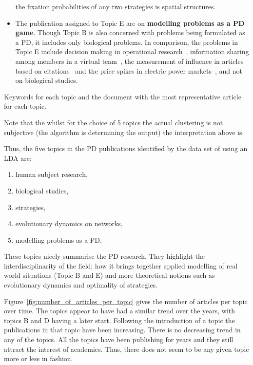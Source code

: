 \begin{itemize}
    the fixation probabilities of any two strategies is spatial
    structures.
    \item The publication assigned to Topic E are on \textbf{modelling problems
    as a PD game}. Though Topic B is also concerned with problems being formulated
    as a PD, it includes only biological problems. In comparison, the problems
    in Topic E include decision making in
    operational research~\cite{ormerod2010or}, information sharing among members
    in a virtual team~\cite{feng2008trilateral}, the measurement of influence
    in articles based on citations~\cite{hutchins2016relative} and the price
    spikes in electric power markets~\cite{Guan2002}, and not on biological studies.
\end{itemize}

\begin{table}[!hbtp]
    \begin{center}
    \resizebox{\textwidth}{!}{
    }
    \end{center}
    \caption{Keywords for each topic and the document with the most representative article for each topic.}
    \label{table:topics_and_articles}
\end{table}

Note that the whilst for the choice of 5 topics the actual clustering is not
subjective (the algorithm is determining the output) the interpretation above is.

Thus, the five topics in the PD publications identified by the data set of using an LDA
are:

 \begin{enumerate} 
    \item human subject research, 
    \item biological studies, 
    \item strategies, 
    \item evolutionary dynamics on networks, 
    \item modelling problems as a PD.
\end{enumerate}
These topics nicely
summarise the PD research. They highlight the interdisciplinarity of the field;
how it brings together applied modelling of real world situations (Topic B and E)
and more theoretical notions such as evolutionary dynamics and optimality of
strategies.

Figure~\ref{fig:number_of_articles_per_topic} gives the number of articles
per topic over time. The topics appear to have had a similar trend over the years,
with topics B and D having a later start. Following the introduction of a topic
the publications in that topic have been increasing. There is no decreasing
trend in any of the topics. All the topics have been publishing for years and
they still attract the interest of academics. Thus, there does not
seem to be any given topic more or less in fashion.

